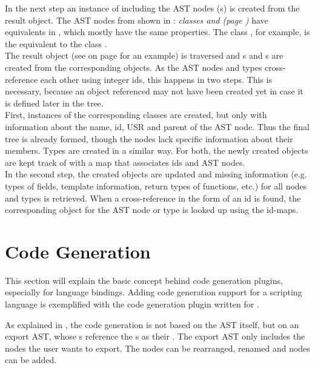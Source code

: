 In the next step an instance of  including the AST nodes (s) is created from the result object. The AST nodes from  shown in : \textit{ classes and  (page \pageref{fig:ASTObjectUML})} have equivalents in , which mostly have the same properties. The  class , for example, is the equivalent to the  class .\\
The  result object (see  on page \pageref{listing:JSON} for an example) is traversed and s and s are created from the corresponding objects. As the AST nodes and types cross-reference each other using integer ids, this happens in two steps. This is necessary, because an object referenced may not have been created yet in case it is defined later in the tree.\\
First, instances of the corresponding classes are created, but only with information about the name, id, USR and parent of the AST node. Thus the final tree is already formed, though the nodes lack specific information about their members. Types are created in a similar way. For both, the newly created objects are kept track of with a map that associates ids and AST nodes.\\
In the second step, the created objects are updated and missing information (e.g. types of fields, template information, return types of functions, etc.) for all nodes and types is retrieved. When a cross-reference in the form of an id is found, the corresponding  object for the AST node or type is looked up using the id-maps.

\section{Code Generation}

This section will explain the basic concept behind code generation plugins, especially for language bindings. Adding code generation support for a scripting language is exemplified with the code generation plugin written for .

As explained in , the code generation is not based on the  AST itself, but on an export AST, whose s reference the s as their . The export AST only includes the nodes the user wants to export. The nodes can be rearranged, renamed and  nodes can be added. 

